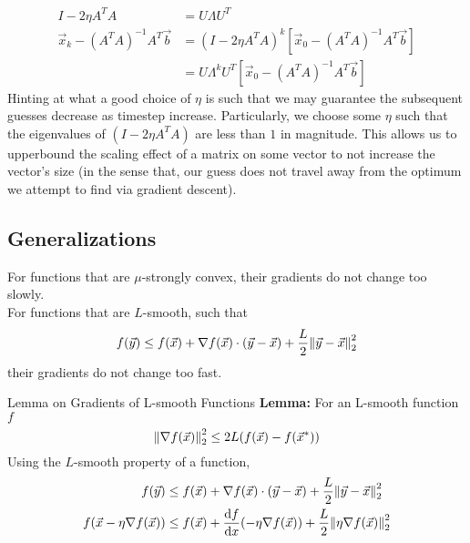 \begin{align*}
    I - 2 \eta A^T A &= U \Lambda U^T \\
    \vec{x}_k - {(A^T A)}^{-1} A^T \vec{b}
    &= {(I - 2 \eta A^T A)}^k [\vec{x}_0 - {(A^T A)}^{-1} A^T \vec{b}] \\
    &= U \Lambda^k U^T [\vec{x}_0 - {(A^T A)}^{-1} A^T \vec{b}]
\end{align*}
Hinting at what a good choice of $\eta$ is such that we may guarantee the subsequent guesses decrease as timestep increase.
Particularly, we choose some $\eta$ such that the eigenvalues of $(I - 2 \eta A^T A)$ are less than $1$ in magnitude.
This allows us to upperbound the scaling effect of a matrix on some vector to not increase the vector's size (in the sense that, our guess does not travel away from the optimum we attempt to find via gradient descent).

\subsection{Generalizations}
For functions that are $\mu$-strongly convex, their gradients do not change too slowly. \\
For functions that are $L$-smooth, such that
\[ 
    f(\vec{y}) \leq f(\vec{x}) + \nabla f(\vec{x}) \cdot (\vec{y} - \vec{x}) + \frac{L}{2} \pnorm[2]{\vec{y} - \vec{x}}{2}
\]
their gradients do not change too fast.

\begin{ln-theorem}{Lemma on Gradients of L-smooth Functions}{}
    \textbf{Lemma:} For an L-smooth function $f$
    \[
        \pnorm[2]{\nabla f(\vec{x})}{2} \leq 2L (f(\vec{x}) - f(\vec{x}^*))
    \]
    \tcblower
    Using the $L$-smooth property of a function,
    \begin{align*}
        f(\vec{y})
        &\leq f(\vec{x}) + \nabla f(\vec{x}) \cdot (\vec{y} - \vec{x}) + \frac{L}{2} \pnorm[2]{\vec{y} - \vec{x}}{2} \\
        f(\vec{x} - \eta \nabla f(\vec{x}))
        &\leq f(\vec{x}) + \dv{f}{x} {} (-\eta \nabla f(\vec{x})) + \frac{L}{2} \pnorm[2]{\eta \nabla f(\vec{x})}{2}
    \end{align*}
\end{ln-theorem}

